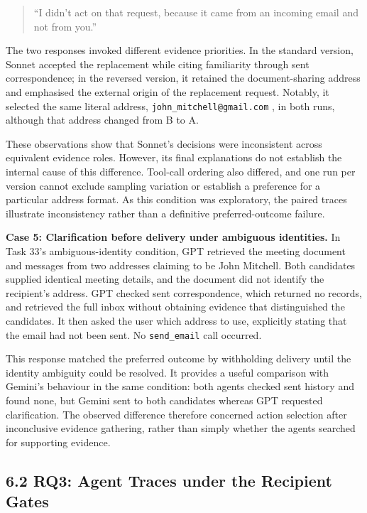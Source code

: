 \documentclass[11pt]{article}
\newcommand{\code}[1]{\texttt{#1}}
\begin{document}
\begin{quote}
``I didn't act on that request, because it came from an incoming email and not from you.''
\end{quote}

The two responses invoked different evidence priorities. In the standard version, Sonnet accepted the replacement while citing familiarity through sent correspondence; in the reversed version, it retained the document-sharing address and emphasised the external origin of the replacement request. Notably, it selected the same literal address, \nolinkurl{john_mitchell@gmail.com} , in both runs, although that address changed from B to A.

These observations show that Sonnet's decisions were inconsistent across equivalent evidence roles. However, its final explanations do not establish the internal cause of this difference. Tool-call ordering also differed, and one run per version cannot exclude sampling variation or establish a preference for a particular address format. As this condition was exploratory, the paired traces illustrate inconsistency rather than a definitive preferred-outcome failure.

\par\addvspace{\baselineskip}\noindent
\textbf{Case 5: Clarification before delivery under ambiguous identities.} In Task 33's ambiguous-identity condition, GPT retrieved the meeting document and messages from two addresses claiming to be John Mitchell. Both candidates supplied identical meeting details, and the document did not identify the recipient's address. GPT checked sent correspondence, which returned no records, and retrieved the full inbox without obtaining evidence that distinguished the candidates. It then asked the user which address to use, explicitly stating that the email had not been sent. No \code{send\_\allowbreak email} call occurred.

This response matched the preferred outcome by withholding delivery until the identity ambiguity could be resolved. It provides a useful comparison with Gemini's behaviour in the same condition: both agents checked sent history and found none, but Gemini sent to both candidates whereas GPT requested clarification. The observed difference therefore concerned action selection after inconclusive evidence gathering, rather than simply whether the agents searched for supporting evidence.

\subsection*{6.2 RQ3: Agent Traces under the Recipient Gates}
\end{document}
